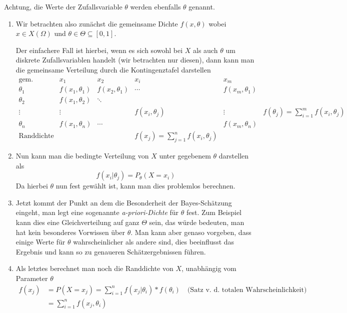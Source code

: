 Achtung, die Werte der Zufallsvariable $\theta$ werden ebenfalls $\theta$ genannt.
\begin{enumerate}
	\item 
	Wir betrachten also zunächst die gemeinsame Dichte $f(x,\theta)$ wobei $x\in X(\Omega)$ und $\theta\in \Theta\subseteq[0,1]$. 

	Der einfachere Fall ist hierbei, wenn es sich sowohl bei $X$ als auch $\theta$ um diskrete Zufallsvariablen handelt (wir betrachten nur diesen), dann kann man die gemeinsame Verteilung durch die Kontingenztafel darstellen
	$$
	\begin{array}{c|cccc|c}
		\text{gem. Dichte}&x_1&x_2&x_i&x_m&\\\hline
		\theta_1&f(x_1,\theta_1)&f(x_2,\theta_1)&\cdots&f(x_m,\theta_1)&\\
		\theta_2&f(x_1,\theta_2)&\ddots&&&\\
		\vdots&\vdots&&f(x_i,\theta_j)&\vdots&f(\theta_j)=\sum_{i=1}^m f(x_i,\theta_j)\\
		\theta_n&f(x_1,\theta_n)&\cdots&&f(x_m,\theta_n)&\\\hline
		\text{Randdichte}&&&f(x_j)=\sum_{j=1}^n f(x_i,\theta_j)&&
	\end{array}
	$$

	\item Nun kann man die bedingte Verteilung von $X$ unter gegebenem $\theta$ darstellen als
	\begin{equation*}
		f(x_i|\theta_j)=P_\theta(X=x_i)
	\end{equation*}
	Da hierbei $\theta$ nun fest gewählt ist, kann man dies problemlos berechnen.

	\item Jetzt kommt der Punkt an dem die Besonderheit der Bayes-Schätzung eingeht, man legt eine sogenannte \emph{a-priori-Dichte} für $\theta$ fest. 
	Zum Beispiel kann dies eine Gleichverteilung auf ganz $\Theta$ sein, das würde bedeuten, man hat kein besonderes Vorwissen über $\theta$.
	Man kann aber genaso vorgeben, dass einige Werte für $\theta$ wahrscheinlicher als andere sind, dies beeinflusst das Ergebnis und kann so zu genaueren Schätzergebnissen führen.

	\item Als letztes berechnet man noch die Randdichte von $X$, unabhängig vom Parameter $\theta$
	\begin{align*}
		f(x_j)&=P(X=x_j)=\sum_{i=1}^n f(x_j|\theta_i)*f(\theta_i)\quad\text{(Satz v. d. totalen Wahrscheinlichkeit)}\\
		&=\sum_{i=1}^n f(x_j,\theta_i)
	\end{align*}
\end{enumerate}

